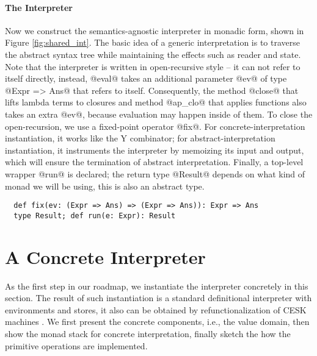 \paragraph{The Interpreter} Now we construct the semantics-agnostic interpreter
in monadic form, shown in Figure \ref{fig:shared_int}. The basic idea
of a generic interpretation is to traverse the abstract syntax tree
while maintaining the effects such as reader and state.  Note that the
interpreter is written in open-recursive style -- it can not refer to
itself directly, instead, @eval@ takes an additional parameter @ev@ of
type @Expr => Ans@ that refers to itself. Consequently, the method
@close@ that lifts lambda terms to closures and method @ap_clo@ that
applies functions also takes an extra @ev@, because evaluation may
happen inside of them.
To close the open-recursion, we use a fixed-point operator @fix@.
For concrete-interpretation instantiation, it works like the Y
combinator; for abstract-interpretation instantiation, it instruments
the interpreter by memoizing its input and output, which will ensure
the termination of abstract interpretation.
Finally, a top-level wrapper @run@ is declared; the return type
@Result@ depends on what kind of monad we will be using, this is also
an abstract type.
\begin{lstlisting}
  def fix(ev: (Expr => Ans) => (Expr => Ans)): Expr => Ans
  type Result; def run(e: Expr): Result
\end{lstlisting}


\section{A Concrete Interpreter} \label{unstaged_conc}

As the first step in our roadmap, we instantiate the interpreter concretely in
this section. The result of such instantiation is a standard definitional
interpreter with environments and stores, it also can be obtained by
refunctionalization of CESK machines \cite{Felleisen:1987:CAH:41625.41654,
DBLP:conf/ppdp/AgerBDM03}. We first present the concrete components, i.e., the
value domain, then show the monad stack for concrete interpretation, finally
sketch the how the primitive operations are implemented.

